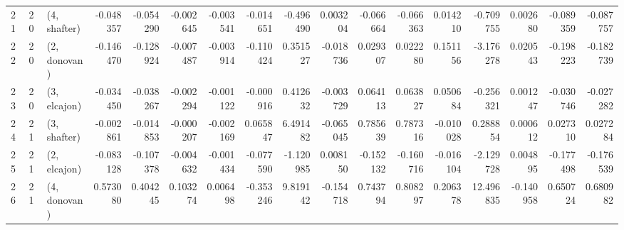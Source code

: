 \begin{tabular}{lllrrrrrrrrrrrrrr}
21 &    20 &  (4, shafter) & -0.048357 & -0.054290 &  -0.002645 & -0.003541 & -0.014651 &  -0.496490 &  0.003204 &  -0.066664 & -0.066363 &  0.014210 &  -0.709755 &  0.002680 & -0.089359 & -0.087757 \\
22 &    20 &  (2, donovan) & -0.146470 & -0.128924 &  -0.007487 & -0.003914 & -0.110424 &   0.351527 & -0.018736 &   0.029307 &  0.022280 &  0.151156 &  -3.176278 &  0.020543 & -0.198223 & -0.182739 \\
23 &    20 &  (3, elcajon) & -0.034450 & -0.038267 &  -0.002294 & -0.001122 & -0.000916 &   0.412632 & -0.003729 &   0.064113 &  0.063827 &  0.050684 &  -0.256321 &  0.001247 & -0.030746 & -0.027282 \\
24 &    21 &  (3, shafter) & -0.002861 & -0.014853 &  -0.000207 & -0.002169 &  0.065847 &   6.491482 & -0.065045 &   0.785639 &  0.787316 & -0.010028 &   0.288854 &  0.000612 &  0.027310 &  0.027284 \\
25 &    21 &  (2, elcajon) & -0.083128 & -0.107378 &  -0.004632 & -0.001434 & -0.077590 &  -1.120985 &  0.008150 &  -0.152132 & -0.160716 & -0.016104 &  -2.129728 &  0.004895 & -0.177498 & -0.176539 \\
26 &    21 &  (4, donovan) &  0.573080 &  0.404245 &   0.103274 &  0.006498 & -0.353246 &   9.819142 & -0.154718 &   0.743794 &  0.808297 &  0.206378 &  12.496835 & -0.140958 &  0.650724 &  0.680982 \\
\bottomrule
\end{tabular}
